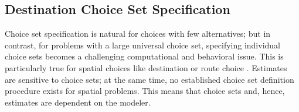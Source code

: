 \subsection{Destination Choice Set Specification}
Choice set specification is natural for choices with few alternatives; but in contrast, for problems with a large universal choice set, specifying individual choice sets becomes a challenging computational and 
behavioral issue.  This is particularly true for spatial choices like destination or route choice \citep[e.g.,][]{PagliaraTimmermans_TransLett_2009, Thill_PHG_1992, Schuessler_PhDThesis_2010, FrejingerEtAl_TransResB_2009}.
Estimates are sensitive to choice sets; at the same time, no established choice set definition procedure exists for spatial problems. 
This means that choice sets and, hence, estimates are 
dependent on the modeler.

